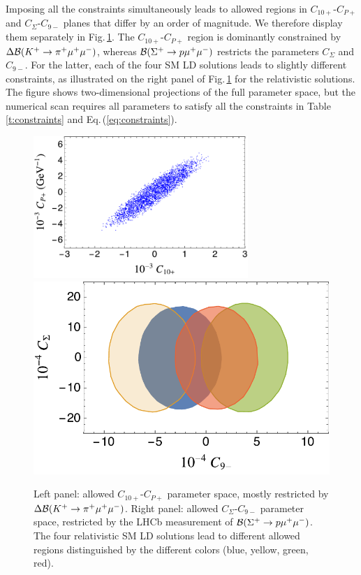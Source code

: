 \documentclass[amsmath,amssymb,aps,nofootinbib,prd,preprint,superscriptaddress,tightenlines,a4paper,bm]{revtex4-2}
\begin{document}
Imposing all the constraints simultaneously leads to allowed regions in $C_{10+}$-$C_{P+}$ and $C_\Sigma$-$C_{9-}$ planes that differ by an order of magnitude.
We therefore display them separately in Fig.\,\ref{f:deltabcon}.
The $C_{10+}$-$C_{P+}$ region is dominantly constrained by $\Delta{\cal B}(K^+\to\pi^+\mu^+\mu^-)$, whereas ${\cal B}(\Sigma^+ \to p \mu^+\mu^-) $ restricts the parameters $C_\Sigma$ and $C_{9-}$.
For the latter, each of the four SM LD solutions leads to slightly different constraints, as illustrated on the right panel of Fig.\,\ref{f:deltabcon} for the relativistic solutions.
The figure shows two-dimensional  projections of the full parameter space, but the numerical scan requires all parameters to satisfy all the constraints in Table\,\ref{t:constraints} and Eq.\,(\ref{eq:constraints}).

\begin{figure}[t]
\includegraphics[width=3.2in]{c10pc9p.pdf} ~ ~ \includegraphics[width=3.in]{c9mcsig.pdf} \vspace{-1ex}
\caption{Left panel:  allowed $C_{10+}$-$C_{P+}$ parameter space, mostly restricted by $\Delta{\cal B}(K^+\to\pi^+\mu^+\mu^-)$. Right panel: allowed $C_\Sigma$-$C_{9-}$ parameter space,  restricted by the LHCb measurement of ${\cal B}(\Sigma^+ \to p \mu^+\mu^-)$.  The four relativistic SM LD solutions lead to different allowed regions distinguished by the different colors (blue, yellow, green, red).} \label{f:deltabcon}
\end{figure}
\end{document}
